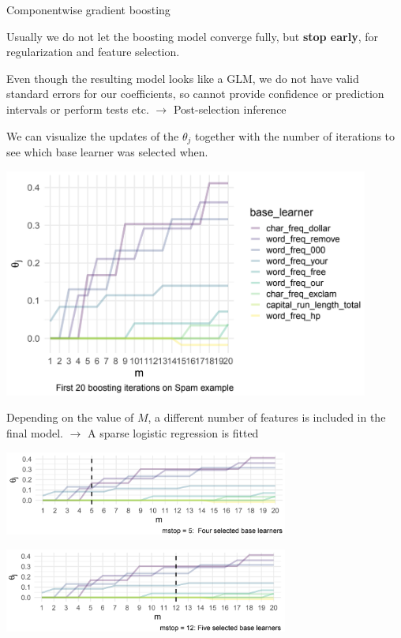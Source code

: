 \begin{vbframe}{Componentwise gradient boosting}
\lz

Usually we do not let the boosting model converge fully, but \textbf{stop early}, for regularization and feature selection.

\lz

Even though the resulting model looks like a GLM, we do not have valid standard errors for our coefficients,
so cannot provide confidence or prediction intervals or perform tests etc.
$\longrightarrow$ Post-selection inference



\framebreak

We can visualize the updates of the $\theta_j$ together with the number of iterations to see which base learner was selected when.

\begin{center}
\includegraphics[width=0.9\textwidth]{figure_man/componentwise-gb.png}
\end{center}

\framebreak

Depending on the value of $M$, a different number of features is included in the final model. $\rightarrow$ A sparse logistic regression is fitted

\begin{center}
\includegraphics[width=0.7\textwidth]{figure_man/mstop5.png}
\end{center}


\begin{center}
\includegraphics[width=0.7\textwidth]{figure_man/mstop12.png}
\end{center}

\end{vbframe}


